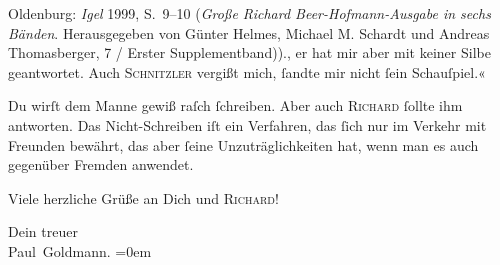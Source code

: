 {{{                     Oldenburg: \emph{Igel}{ }1999, S. 9–10 (\emph{Große Richard
                        Beer-Hofmann-Ausgabe in sechs Bänden}. Herausgegeben von Günter Helmes, Michael
                     M. Schardt und Andreas Thomasberger, 7 / Erster Supplementband)).}}}\label{K_L02800-3}, er hat mir aber mit keiner Silbe geantwortet. Auch \textsc{Schnitzler} vergißt mich,{ }ſandte mir nicht{ }ſein Schauſpiel.«\pend
           
\pstart
           {\pb}Du wirſt dem Manne gewiß raſch{ }ſchreiben. Aber auch \textsc{Richard}{ }ſollte ihm antworten. Das Nicht-Schreiben iſt ein Verfahren, das{ }ſich nur im
               Verkehr mit Freunden bewährt, das aber{ }ſeine Unzuträglichkeiten hat, wenn man es auch
               gegenüber Fremden  anwendet.\pend
           
\pstart
           Viele herzliche Grüße an Dich und \textsc{Richard}!\pend
           
\pstart
           Dein treuer {\\[\baselineskip]}\spacefill\mbox{Paul Goldmann.}\pend
           \leftskip=0em{}\endnumbering{}  \newcommand{\dateiname}{L02800}\newcommand{\titel}{Paul Goldmann an Arthur Schnitzler, 8. 1. [1897]}\newcommand{\editorInnen}{Martin Anton Müller und Laura Untner}
